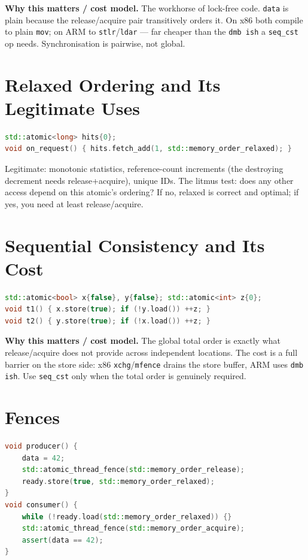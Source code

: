 \textbf{Why this matters / cost model.} The workhorse of lock-free code. \texttt{data} is plain because the release/acquire pair transitively orders it. On x86 both compile to plain \texttt{mov}; on ARM to \texttt{stlr}/\texttt{ldar} --- far cheaper than the \texttt{dmb ish} a \texttt{seq\_cst} op needs. Synchronisation is pairwise, not global.

\section{Relaxed Ordering and Its Legitimate Uses}
\begin{lstlisting}[language=C++, caption={A relaxed statistic counter. Min standard: C++11.}]
std::atomic<long> hits{0};
void on_request() { hits.fetch_add(1, std::memory_order_relaxed); }
\end{lstlisting}

Legitimate: monotonic statistics, reference-count increments (the destroying decrement needs release+acquire), unique IDs. The litmus test: does any other access depend on this atomic's ordering? If no, relaxed is correct and optimal; if yes, you need at least release/acquire.

\section{Sequential Consistency and Its Cost}
\begin{lstlisting}[language=C++, caption={Dekker-style: only seq\_cst forbids z==2. Min standard: C++11.}]
std::atomic<bool> x{false}, y{false}; std::atomic<int> z{0};
void t1() { x.store(true); if (!y.load()) ++z; }
void t2() { y.store(true); if (!x.load()) ++z; }
\end{lstlisting}

\textbf{Why this matters / cost model.} The global total order is exactly what release/acquire does not provide across independent locations. The cost is a full barrier on the store side: x86 \texttt{xchg}/\texttt{mfence} drains the store buffer, ARM uses \texttt{dmb ish}. Use \texttt{seq\_cst} only when the total order is genuinely required.

\section{Fences}
\begin{lstlisting}[language=C++, caption={A standalone fence pairs with another fence/operation. Min standard: C++11.}]
void producer() {
    data = 42;
    std::atomic_thread_fence(std::memory_order_release);
    ready.store(true, std::memory_order_relaxed);
}
void consumer() {
    while (!ready.load(std::memory_order_relaxed)) {}
    std::atomic_thread_fence(std::memory_order_acquire);
    assert(data == 42);
}
\end{lstlisting}


